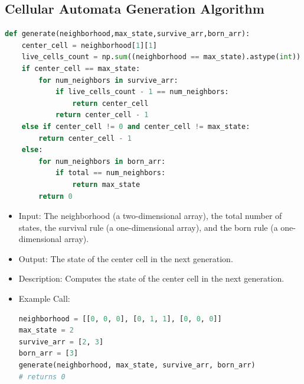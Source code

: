 \documentclass[12pt]{article}
\numberwithin{figure}{section} %
\begin{document}
\subsection{Cellular Automata Generation Algorithm}
\label{subsection:Cellular Automata Generation Algorithm}
\begin{lstlisting}[language=Python]
def generate(neighborhood,max_state,survive_arr,born_arr):
    center_cell = neighborhood[1][1]
    live_cells_count = np.sum((neighborhood == max_state).astype(int))
    if center_cell == max_state: 
        for num_neighbors in survive_arr:
            if live_cells_count - 1 == num_neighbors: 
                return center_cell 
            return center_cell - 1
    else if center_cell != 0 and center_cell != max_state:
        return center_cell - 1
    else:
        for num_neighbors in born_arr: 
            if total == num_neighbors:
                return max_state 
        return 0
\end{lstlisting}
\vspace{-1.5em}
\begin{itemize}[leftmargin = 0.5cm, topsep=0pt,itemsep=-1ex,partopsep=1ex,parsep=1ex]
\item Input: The neighborhood (a two-dimensional array), the total number of states, the survival rule (a one-dimensional array), and the born rule (a one-dimensional array). 
\item Output: The state of the center cell in the next generation.  
\item Description: Computes the state of the center cell in the next generation. 
\item Example Call: 
\begin{lstlisting}[language = Python]
neighborhood = [[0, 0, 0], [0, 1, 1], [0, 0, 0]]
max_state = 2
survive_arr = [2, 3]
born_arr = [3]
generate(neighborhood, max_state, survive_arr, born_arr) 
# returns 0
\end{lstlisting}
\end{itemize}
\end{document}
